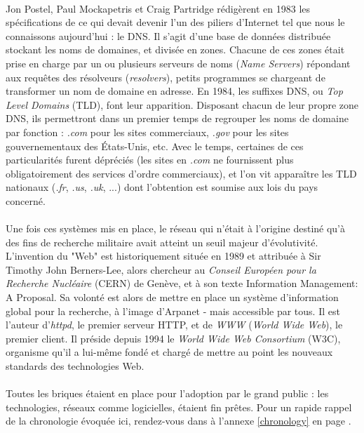 \paragraph{} Jon Postel, Paul Mockapetris et Craig Partridge rédigèrent en 1983 les spécifications de ce qui devait 
devenir l'un des piliers d'Internet tel que nous le connaissons aujourd'hui : le DNS. Il s'agit d'une base de données
distribuée stockant les noms de domaines, et divisée en zones. Chacune de ces zones était prise en charge par un ou plusieurs
serveurs de noms (\emph{Name Servers}) répondant aux requêtes des résolveurs (\emph{resolvers}), petits programmes se
chargeant de transformer un nom de domaine en adresse. En 1984, les suffixes DNS, ou \emph{Top Level Domains} (TLD),
font leur apparition. Disposant chacun de leur propre zone DNS, ils permettront dans un premier temps de regrouper les
noms de domaine par fonction : \emph{.com} pour les sites commerciaux, \emph{.gov} pour les sites gouvernementaux des
États-Unis, etc. Avec le temps, certaines de ces particularités furent dépréciés (les sites en \emph{.com}
ne fournissent plus obligatoirement des services d'ordre commerciaux), et l'on vit apparaître les TLD nationaux (\emph{.fr},
\emph{.us}, \emph{.uk}, ...) dont l'obtention est soumise aux lois du pays concerné.

\paragraph{} Une fois ces systèmes mis en place, le réseau qui n'était à l'origine destiné qu'à des fins de recherche
militaire avait atteint un seuil majeur d'évolutivité. L'invention du "Web" est historiquement située en 1989 et
attribuée à Sir Timothy John Berners-Lee, alors chercheur au \emph{Conseil Européen pour la Recherche Nucléaire} (CERN)
de Genève, et à son texte \guillemotleft Information Management: A Proposal\guillemotright \cite{Internet1}. Sa volonté
est alors de mettre en place un système d'information global pour la recherche, à l'image d'Arpanet - mais accessible par tous.
Il est l'auteur d'\emph{httpd}, le premier serveur HTTP, et de \emph{WWW} (\emph{World Wide Web}), le premier client.
Il préside depuis 1994 le \emph{World Wide Web Consortium} (W3C), organisme qu'il a lui-même fondé et chargé de mettre
au point les nouveaux standards des technologies Web.

\paragraph{} Toutes les briques étaient en place pour l'adoption par le grand public : les technologies, réseaux comme
logicielles, étaient fin prêtes. Pour un rapide rappel de la chronologie évoquée ici, rendez-vous dans à l'annexe
\ref{chronology} en page \pageref{chronology}.

